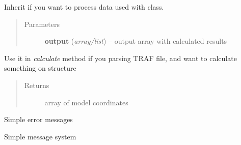 \documentclass[letterpaper,10pt,english]{sphinxmanual}
\begin{document}

\begin{fulllineitems}
\label{api:pycabs.Calculate}
Inherit if you want to process data used with {\hyperref[api:pycabs.Monitor]{}} class.
\begin{quote}\begin{description}
\item[{Parameters}] \leavevmode
\textbf{output} (\emph{array/list}) -- output array with calculated results

\end{description}\end{quote}

\begin{fulllineitems}
\label{api:pycabs.Calculate.processTrajectory}
Use it in \emph{calculate} method if you parsing TRAF file, and want to calculate something on structure
\begin{quote}\begin{description}
\item[{Returns}] \leavevmode
array of model coordinates

\end{description}\end{quote}

\end{fulllineitems}


\end{fulllineitems}


\begin{fulllineitems}
\label{api:pycabs.Errors}
Simple error messages

\end{fulllineitems}


\begin{fulllineitems}
\label{api:pycabs.Info}
Simple message system

\end{fulllineitems}
\end{document}
